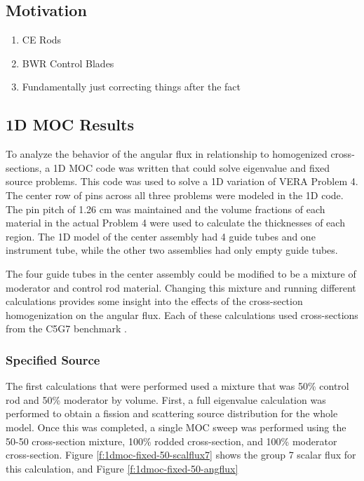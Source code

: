 \subsection{Motivation}

\begin{enumerate}[leftmargin=*]
  \item CE Rods
  \item BWR Control Blades
  \item Fundamentally just correcting things after the fact
\end{enumerate}

\subsection{1D MOC Results}

To analyze the behavior of the angular flux in relationship to homogenized cross-sections, a 1D MOC code was written that could solve eigenvalue and fixed source problems.  This code was used to solve a 1D variation of VERA Problem 4.  The center row of pins across all three problems were modeled in the 1D code.  The pin pitch of 1.26 cm was maintained and the volume fractions of each material in the actual Problem 4 were used to calculate the thicknesses of each region.  The 1D model of the center assembly had 4 guide tubes and one instrument tube, while the other two assemblies had only empty guide tubes.

The four guide tubes in the center assembly could be modified to be a mixture of moderator and control rod material.  Changing this mixture and running different calculations provides some insight into the effects of the cross-section homogenization on the angular flux.  Each of these calculations used cross-sections from the C5G7 benchmark .

\subsubsection{Specified Source}

The first calculations that were performed used a mixture that was 50\% control rod and 50\% moderator by volume.  First, a full eigenvalue calculation was performed to obtain a fission and scattering source distribution for the whole model.  Once this was completed, a single MOC sweep was performed using the 50-50 cross-section mixture, 100\% rodded cross-section, and 100\% moderator cross-section.  Figure \ref{f:1dmoc-fixed-50-scalflux7} shows the group 7 scalar flux for this calculation, and Figure \ref{f:1dmoc-fixed-50-angflux}

